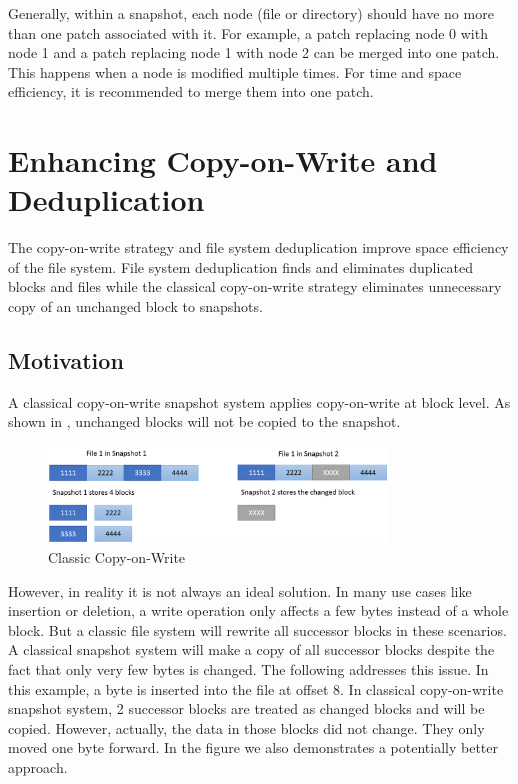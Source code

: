 	Generally, within a snapshot, each node (file or directory) should have no more than one patch associated with it. For example, a patch replacing node 0 with node 1 and a patch replacing node 1 with node 2 can be merged into one patch. This happens when a node is modified multiple times. For time and space efficiency, it is recommended to merge them into one patch.
	
\section{Enhancing Copy-on-Write and Deduplication}

	The copy-on-write strategy and file system deduplication improve space efficiency of the file system. File system deduplication finds and eliminates duplicated blocks and files while the classical copy-on-write strategy eliminates unnecessary copy of an unchanged block to snapshots.

\subsection{Motivation}

    A classical copy-on-write snapshot system applies copy-on-write at block level. As shown in , unchanged blocks will not be copied to the snapshot.

\begin{figure}[hbtp]
\centering
\includegraphics[width=0.8\textwidth]{Chapter-4/figs/fig4.png}
\caption{Classic Copy-on-Write}
\label{fig:classic_cow}
\end{figure}

    However, in reality it is not always an ideal solution. In many use cases like insertion or deletion, a write operation only affects a few bytes instead of a whole block. But a classic file system will rewrite all successor blocks in these scenarios. A classical snapshot system will make a copy of all successor blocks despite the fact that only very few bytes is changed. The following  addresses this issue. In this example, a byte is inserted into the file at offset 8. In classical copy-on-write snapshot system, 2 successor blocks are treated as changed blocks and will be copied. However, actually, the data in those blocks did not change. They only moved one byte forward. In the figure we also demonstrates a potentially better approach.

